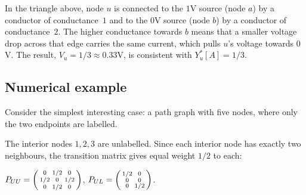 \begin{notechapter}
\begin{intuition}
In the triangle above, node $u$ is connected to the $1$V source (node $a$)
by a conductor of conductance~$1$ and to the $0$V source (node $b$) by a
conductor of conductance~$2$. The higher conductance towards $b$ means
that a smaller voltage drop across that edge carries the same current, which pulls $u$'s
voltage towards $0$V. The result,
$V_u = 1/3 \approx 0.33\text{V}$, is consistent with $Y_u^*[A] = 1/3$.
\end{intuition}

\subsection{Numerical example}
\label{semi-supervised-graphs:subsec:lp_example}

\begin{example}
\label{semi-supervised-graphs:ex:lp_path}
Consider the simplest interesting case: a path graph with five nodes, where
only the two endpoints are labelled.

\begin{center}
\end{center}

The interior nodes $1, 2, 3$ are unlabelled. Since each interior node has
exactly two neighbours, the transition matrix gives equal weight $1/2$ to each:

$P_{UU} = \begin{psmallmatrix} 0 & 1/2 & 0 \\ 1/2 & 0 & 1/2 \\
0 & 1/2 & 0 \end{psmallmatrix}$, \;
$P_{UL} = \begin{psmallmatrix} 1/2 & 0 \\ 0 & 0 \\ 0 & 1/2 \end{psmallmatrix}$.


\end{example}
\end{notechapter}
